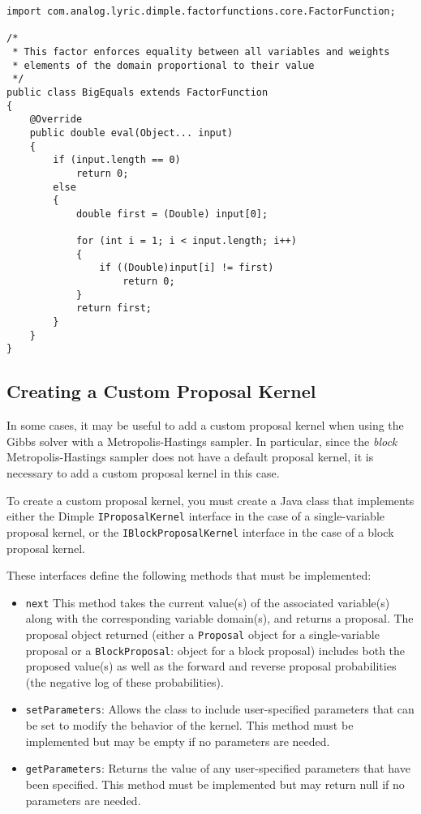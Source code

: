 \begin{lstlisting}
import com.analog.lyric.dimple.factorfunctions.core.FactorFunction;

/*
 * This factor enforces equality between all variables and weights
 * elements of the domain proportional to their value
 */
public class BigEquals extends FactorFunction
{	
    @Override
    public double eval(Object... input)
    {
        if (input.length == 0)
            return 0;
        else
        {
            double first = (Double) input[0];
            
            for (int i = 1; i < input.length; i++)
            {
                if ((Double)input[i] != first)
                    return 0;
            }
            return first;   
        }
    }
}
\end{lstlisting}




\subsection{Creating a Custom Proposal Kernel}
\label{sec:CreatingACustomProposalKernel}

In some cases, it may be useful to add a custom proposal kernel when using the Gibbs solver with a Metropolis-Hastings sampler.  In particular, since the \emph{block} Metropolis-Hastings sampler does not have a default proposal kernel, it is necessary to add a custom proposal kernel in this case.

To create a custom proposal kernel, you must create a Java class that implements either the Dimple \texttt{IProposalKernel} interface in the case of a single-variable proposal kernel, or the \texttt{IBlockProposalKernel} interface in the case of a block proposal kernel.

These interfaces define the following methods that must be implemented:
%
\begin{itemize}
%
\item \texttt{next} This method takes the current value(s) of the associated variable(s) along with the corresponding variable domain(s), and returns a proposal.  The proposal object returned (either a \texttt{Proposal} object for a single-variable proposal or a \texttt{BlockProposal}: object for a block proposal) includes both the proposed value(s) as well as the forward and reverse proposal probabilities (the negative log of these probabilities).
%
\item \texttt{setParameters}: Allows the class to include user-specified parameters that can be set to modify the behavior of the kernel.  This method must be implemented but may be empty if no parameters are needed.
%
\item \texttt{getParameters}: Returns the value of any user-specified parameters that have been specified.  This method must be implemented but may return null if no parameters are needed.
%
\end{itemize}


